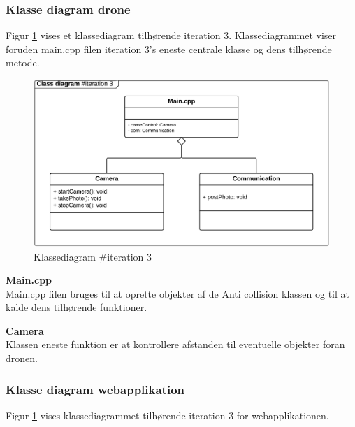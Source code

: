\subsubsection*{Klasse diagram drone}

Figur \ref{fig:classDiagram_iteration3} vises et klassediagram tilhørende iteration 3. Klassediagrammet viser foruden main.cpp filen iteration 3's eneste centrale klasse og dens tilhørende metode. 

\begin{figure}[H]
	\centering
	\includegraphics[width=1\textwidth]{Billeder/klasse_diagrammer/classdiagram_iteration3.png}
	\vspace{-0.5cm}
	\caption{Klassediagram \#iteration 3}
	\label{fig:classDiagram_iteration3}
\end{figure}

\textbf{Main.cpp} \\
Main.cpp filen bruges til at oprette objekter af de Anti collision klassen og til at kalde dens tilhørende funktioner.

\textbf{Camera} \\
Klassen eneste funktion er at kontrollere afstanden til eventuelle objekter foran dronen. 


\newpage

\subsubsection*{Klasse diagram webapplikation}

Figur \ref{fig:classDiagram_iteration3} vises klassediagrammet tilhørende iteration 3 for webapplikationen. 


